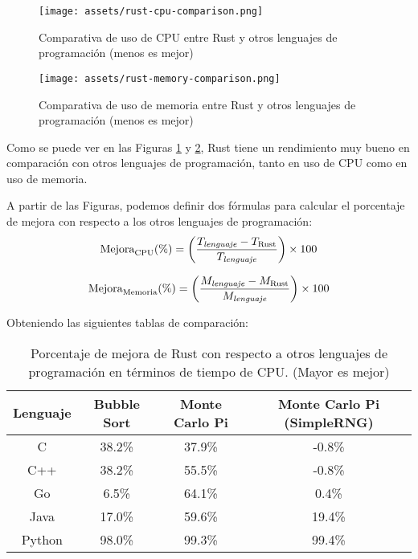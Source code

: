 \begin{figure}[H]
  \centering
  \texttt{[image: assets/rust-cpu-comparison.png]}
  \caption{Comparativa de uso de CPU entre Rust y otros lenguajes de programación (menos es mejor) \parencite{rust-for-safety-and-performance}}
  \label{fig:rust-cpu-comparison}
\end{figure}


\begin{figure}[H]
  \centering
  \texttt{[image: assets/rust-memory-comparison.png]}
  \caption{Comparativa de uso de memoria entre Rust y otros lenguajes de programación (menos es mejor) \parencite{rust-for-safety-and-performance}}
  \label{fig:rust-memory-comparison}
\end{figure}

Como se puede ver en las Figuras \ref{fig:rust-cpu-comparison} y \ref{fig:rust-memory-comparison}, Rust tiene un rendimiento muy bueno en comparación con otros lenguajes de programación, tanto en uso de CPU como en uso de memoria.

A partir de las Figuras, podemos definir dos fórmulas para calcular el porcentaje de mejora con respecto a los otros lenguajes de programación:
\begin{equation}
    \text{Mejora}_{\text{CPU}} (\%) = \left( \frac{T_{\text{\textit{lenguaje}}} - T_{\text{Rust}}}{T_{\text{\textit{lenguaje}}}} \right) \times 100
\end{equation}

\begin{equation}
    \text{Mejora}_{\text{Memoria}} (\%) = \left( \frac{M_{\text{\textit{lenguaje}}} - M_{\text{Rust}}}{M_{\text{\textit{lenguaje}}}} \right) \times 100
\end{equation}


Obteniendo las siguientes tablas de comparación:

\begin{table}[H]
\centering
\begin{tabular}{|c|c|c|c|}
\hline
\textbf{Lenguaje} & \textbf{Bubble Sort} & \textbf{Monte Carlo Pi} & \textbf{Monte Carlo Pi (SimpleRNG)} \\
\hline
C      & 38.2\%  & 37.9\%  & -0.8\% \\
C++    & 38.2\%  & 55.5\%  & -0.8\% \\
Go     & 6.5\%   & 64.1\%  & 0.4\%           \\
Java   & 17.0\%  & 59.6\%  & 19.4\%          \\
Python & 98.0\%  & 99.3\%  & 99.4\%          \\
\hline
\end{tabular}
\caption{Porcentaje de mejora de Rust con respecto a otros lenguajes de programación en términos de tiempo de CPU. (Mayor es mejor)}
\end{table}

